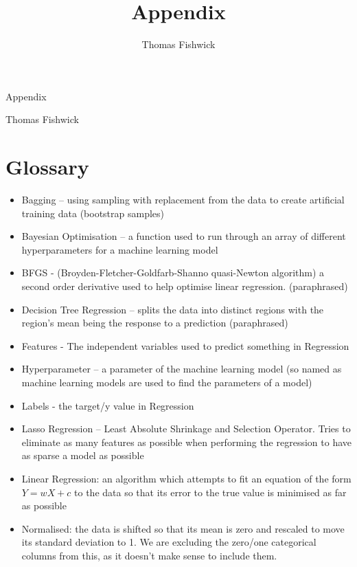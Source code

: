 \documentclass[a4pape, 11pt, english]{article}
\title{Appendix}
\author{Thomas Fishwick}
\begin{document}
\begin{center}
\huge
Appendix

\large
Thomas Fishwick
\end{center}

\section{Glossary}
\begin{itemize}
	\addtolength\itemsep{-4mm}	

	\item Bagging – using sampling with replacement from the data to create artificial training data (bootstrap samples)
	\item Bayesian Optimisation – a function used to run through an array of different hyperparameters for a machine learning model
	\item BFGS - (Broyden-Fletcher-Goldfarb-Shanno quasi-Newton algorithm) a second order derivative used to help optimise linear regression.\citep{brownlee_gentle_2021} (paraphrased)
	\item Decision Tree Regression – splits the data into distinct regions with the region’s mean being the response to a prediction \citep{james_gareth_introduction_2021} (paraphrased)
	\item Features - The independent variables used to predict something in Regression
	\item Hyperparameter – a parameter of the machine learning model (so named as machine learning models are used to find the parameters of a model)
	\item Labels - the target/y value in Regression
	\item Lasso Regression – Least Absolute Shrinkage and Selection Operator. Tries to eliminate as many features as possible when performing the regression to have as sparse a model as possible \citep{stephanie_lasso_2015}
	\item Linear Regression: an algorithm which attempts to fit an equation of the form $Y = wX + c$ to the data so that its error to the true value is minimised as far as possible
	\item Normalised: the data is shifted so that its mean is zero and rescaled to move its standard deviation to 1. We are excluding the zero/one categorical columns from this, as it doesn’t make sense to include them.

\end{itemize}
\end{document}

